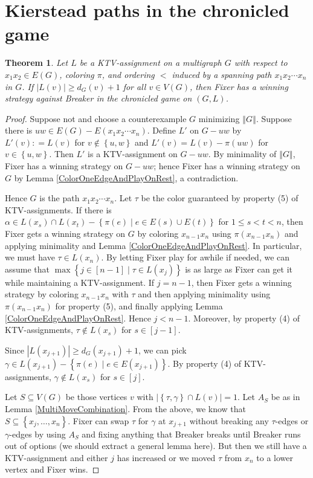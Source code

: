 \documentclass[12pt,reqno]{amsart}
\theoremstyle{plain}
\newtheorem{thm}{Theorem}
\theoremstyle{definition}
\theoremstyle{remark}
\newcommand{\set}[1]{\left\{ #1 \right\}}
\newcommand{\setbs}[2]{\left\{ #1 \mid #2 \right\}}
\newcommand{\card}[1]{\left|#1\right|}
\newcommand{\size}[1]{\left\Vert#1\right\Vert}
\newcommand{\irange}[1]{\left[#1\right]}
\newcommand{\DefinedAs}{\mathrel{\mathop:}=}
\begin{document}
\section{Kierstead paths in the chronicled game}
\begin{thm}\label{KiersteadChronicled}
Let $L$ be a KTV-assignment on a multigraph $G$ with respect to $x_1x_2 \in E(G)$, coloring $\pi$, and ordering $<$ induced by a spanning path $x_1x_2\cdots x_n$ in $G$.  If $\card{L(v)} \ge d_G(v) + 1$ for all $v \in V(G)$, then Fixer has a winning strategy against Breaker in the chronicled game on $(G, L)$.
\end{thm}
\begin{proof}
Suppose not and choose a counterexample $G$ minimizing $\size{G}$.  Suppose
there is $uw \in E(G) - E(x_1x_2\cdots x_n)$.  Define $L'$ on $G-uw$ by $L'(v)
\DefinedAs L(v)$ for $v \not \in \set{u, w}$ and $L'(v) = L(v) -
\pi(uw)$ for $v \in \set{u, w}$.  Then $L'$ is a KTV-assignment on $G-uw$. By
minimality of $\size{G}$, Fixer has a winning strategy on $G-uw$; hence Fixer
has a winning strategy on $G$ by Lemma \ref{ColorOneEdgeAndPlayOnRest}, a
contradiction.

Hence $G$ is the path $x_1x_2\cdots x_n$.  Let $\tau$ be the color guaranteed by property (5) of KTV-assignments.  If there is $\alpha \in L(x_s) \cap L(x_t) - \setbs{\pi(e)}{e \in E(s) \cup E(t)}$ for $1 \le s < t < n$, then Fixer gets a winning strategy on $G$ by coloring $x_{n-1}x_n$ using $\pi(x_{n-1}x_n)$ and applying minimality and Lemma \ref{ColorOneEdgeAndPlayOnRest}.  In particular, we must have $\tau \in L(x_n)$.  By letting Fixer play for awhile if needed, we can assume that $\max\setbs{j \in \irange{n-1}}{\tau \in L(x_j)}$ is as large as Fixer can get it while maintaining a KTV-assignment.  If $j = n - 1$, then Fixer gets a winning strategy by coloring $x_{n-1}x_n$ with $\tau$ and then applying minimality using $\pi(x_{n-1}x_n)$ for property (5), and finally applying Lemma \ref{ColorOneEdgeAndPlayOnRest}. Hence $j < n - 1$. Moreover, by property (4) of KTV-assignments, $\tau \not \in L(x_s)$ for $s \in \irange{j - 1}$.

Since $\card{L(x_{j+1})} \ge d_G(x_{j+1}) + 1$, we can pick $\gamma \in L(x_{j+1}) - \setbs{\pi(e)}{e \in E(x_{j+1})}$. By property (4) of KTV-assignments, $\gamma \not \in L(x_s)$ for $s \in \irange{j}$. 

Let $S \subseteq V(G)$ be those vertices $v$ with $\card{\set{\tau, \gamma} \cap L(v)} = 1$. Let $A_S$ be as in Lemma \ref{MultiMoveCombination}.  From the above, we know that $S \subseteq \set{x_j, \ldots, x_n}$.
Fixer can swap $\tau$ for $\gamma$ at $x_{j+1}$ without breaking any $\tau$-edges or $\gamma$-edges by using $A_S$ and fixing anything that Breaker breaks until Breaker runs out of options (we should extract a general lemma here).  But then we still have a KTV-assignment and either $j$ has increased or we moved $\tau$ from $x_n$ to a lower vertex and Fixer wins.
\end{proof}
\end{document}

